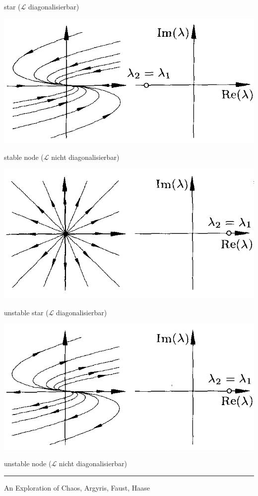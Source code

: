\documentclass[12pt,compress]{beamer}
\begin{document}
{\begin{center}
{    star ($\mathcal{L}$ diagonalisierbar)
    }
    {
    \includegraphics[scale=0.5]{08_stable_node.png}

    stable node ($\mathcal{L}$ nicht diagonalisierbar)
    }
    {
    \includegraphics[scale=0.5]{09_unstable_star.png}

    unstable star ($\mathcal{L}$ diagonalisierbar)
    }
    {
    \includegraphics[scale=0.5]{10_unstable_node.png}

    unstable node ($\mathcal{L}$ nicht diagonalisierbar)
    }
    \end{center}

    \vfill
    \noindent\rule{8cm}{0.4pt}

    An Exploration of Chaos, Argyris, Faust, Haase
}
\end{document}
